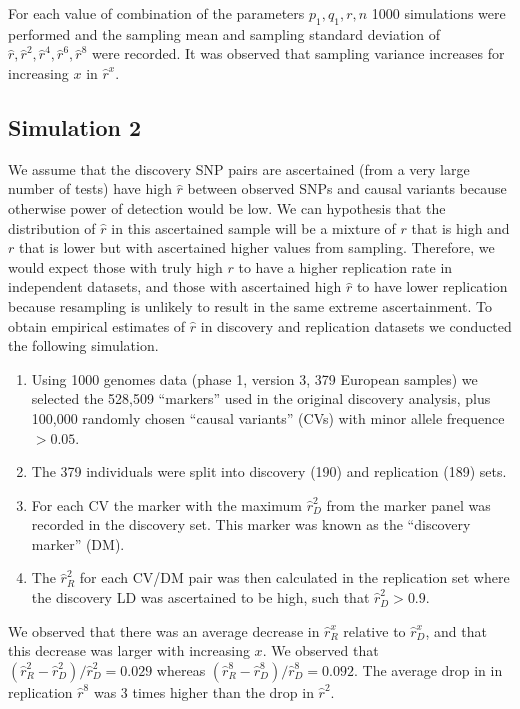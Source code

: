 \documentclass{article}
\begin{document}
For each value of combination of the parameters $p_{1}, q_{1}, r, n$ 1000 simulations were performed and the sampling mean and sampling standard deviation of $\hat{r}, \hat{r}^2, \hat{r}^4, \hat{r}^6, \hat{r}^8$ were recorded. It was observed that sampling variance increases for increasing $x$ in $\hat{r}^x$.


\subsection{Simulation 2}

We assume that the discovery SNP pairs are ascertained (from a very large number of tests) have high $\hat{r}$ between observed SNPs and causal variants because otherwise power of detection would be low. We can hypothesis that the distribution of $\hat{r}$ in this ascertained sample will be a mixture of $r$ that is high and $r$ that is lower but with ascertained higher values from sampling. Therefore, we would expect those with truly high $r$ to have a higher replication rate in independent datasets, and those with ascertained high $\hat{r}$ to have lower replication because resampling is unlikely to result in the same extreme ascertainment. To obtain empirical estimates of $\hat{r}$ in discovery and replication datasets we conducted the following simulation.

\begin{enumerate}
\item Using 1000 genomes data (phase 1, version 3, 379 European samples) we selected the 528,509 ``markers'' used in the original discovery analysis, plus 100,000 randomly chosen ``causal variants'' (CVs) with minor allele frequence $> 0.05$.
\item The 379 individuals were split into discovery (190) and replication (189) sets.
\item For each CV the marker with the maximum $\hat{r}^2_{D}$ from the marker panel was recorded in the discovery set. This marker was known as the ``discovery marker'' (DM).
\item The $\hat{r}^2_{R}$ for each CV/DM pair was then calculated in the replication set where the discovery LD was ascertained to be high, such that $\hat{r}^2_{D} > 0.9$.
\end{enumerate}

We observed that there was an average decrease in $\hat{r}^x_{R}$ relative to $\hat{r}^x_{D}$, and that this decrease was larger with increasing $x$. We observed that $(\hat{r}^2_{R} - \hat{r}^2_{D}) / \hat{r}^2_{D} = 0.029$ whereas $(\hat{r}^8_{R} - \hat{r}^8_{D}) / \hat{r}^8_{D} = 0.092$. The average drop in in replication $\hat{r}^8$ was 3 times higher than the drop in $\hat{r}^2$.
\end{document}
